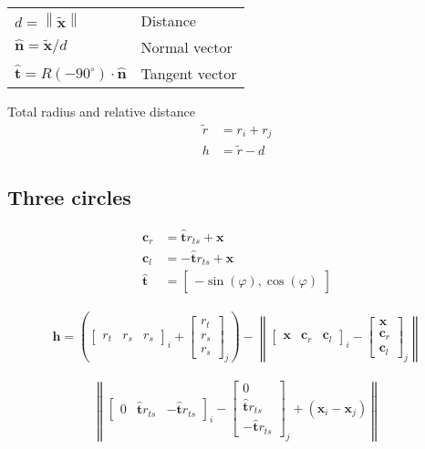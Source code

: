 \begin{table}[H]
\begin{tabularx}{1.0\linewidth}{ll}
\hline
\hline
$ d = \left\|\tilde{\mathbf{x}}\right\| $ & Distance\\
$ \hat{\mathbf{n}} = \tilde{\mathbf{x}} / d $ & Normal vector \\
$ \hat{\mathbf{t}} = R(-90^{\circ}) \cdot \hat{\mathbf{n}} $ & Tangent vector \\
\hline
\hline
\end{tabularx}
\end{table}

Total radius and relative distance
\begin{align}
\tilde{r} &= r_{i} + r_{j} \\
h &= \tilde{r} - d
\end{align}


\subsection{Three circles}

\begin{align}
\mathbf{c}_{r} &= \hat{\mathbf{t}} r_{ts} + \mathbf{x}\\
\mathbf{c}_{l} &= - \hat{\mathbf{t}} r_{ts} + \mathbf{x} \\
\hat{\mathbf{t}} &= \begin{bmatrix}
-\sin(\varphi), \cos(\varphi)
\end{bmatrix}
\end{align}

\begin{align}
\mathbf{h} = \left(\begin{bmatrix} r_{t} & r_{s} & r_{s} \end{bmatrix}_{i} + \begin{bmatrix} r_{t} \\ r_{s} \\ r_{s} \end{bmatrix}_{j}\right) - \left\|\begin{bmatrix} \mathbf{x} & \mathbf{c}_{r} & \mathbf{c}_{l} \end{bmatrix}_{i} - \begin{bmatrix} \mathbf{x} \\ \mathbf{c}_{r} \\ \mathbf{c}_{l} \end{bmatrix}_{j}\right\|
\end{align}

\begin{align}
\left\|\begin{bmatrix} 0 & \hat{\mathbf{t}} r_{ts} & -\hat{\mathbf{t}} r_{ts} \end{bmatrix}_{i} - \begin{bmatrix} 0 \\ \hat{\mathbf{t}} r_{ts} \\ -\hat{\mathbf{t}} r_{ts} \end{bmatrix}_{j}  + (\mathbf{x}_{i} - \mathbf{x}_{j}) \right\|
\end{align}

